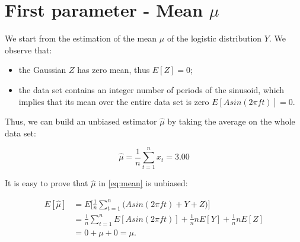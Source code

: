 \section{First parameter - Mean $\mu$}
\label{sec:mean}

We start from the estimation of the mean $\mu$ of the logistic distribution $Y$.
We observe that:
\begin{itemize}
    \item the Gaussian $Z$ has zero mean, thus $E[Z] = 0$;
    \item the data set contains an integer number of periods of the sinusoid, which implies that its mean over the entire data set is zero $E[Asin(2 \pi f t)] = 0$.
\end{itemize}

Thus, we can build an unbiased estimator $\hat{\mu}$ by taking the average on the whole data set:

\begin{equation}
    \hat{\mu} = \frac{1}{n}\sum_{t=1}^{n}x_t = 3.00
    \label{eq:mean}
\end{equation}

It is easy to prove that $\hat{\mu}$ in \cref{eq:mean} is unbiased:

\begin{equation*}
    \begin{split}
        E[\hat{\mu}] &= E \Big[ \frac{1}{n}\sum_{t=1}^{n} \big( A sin(2 \pi f t) + Y + Z \big) \Big] \\
                     &= \frac{1}{n} \sum_{t=1}^{n} E[A sin(2 \pi f t)] + \frac{1}{n} n E[Y] + \frac{1}{n} n E[Z] \\
                     &= 0 + \mu + 0 = \mu.
    \end{split}
\end{equation*}
